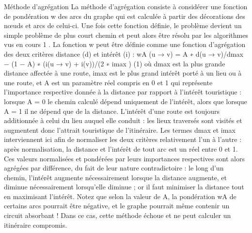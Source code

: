  
Méthode d’agrégation
La méthode d’agrégation consiste à considérer une fonction de pondération w des arcs du graphe
qui est calculée à partir des décorations des nœuds et arcs de celui-ci. Une fois cette fonction définie, le
problème devient un simple problème de plus court chemin et peut alors être résolu par les algorithmes
vus en cours 1 . La fonction w peut être définie comme une fonction d’agrégation des deux critères distance
(d) et intérêt (i) :
wA (u → v) = A ∗ d(u → v)/dmax − (1 − A) ∗ (i(u → v) + i(v))/(2 ∗ imax )
(1)
où dmax est la plus grande distance affectée à une route, imax est le plus grand intérêt porté à un lieu ou
à une route, et A est un paramètre réel compris en 0 et 1 qui représente l’importance respective donnée
à la distance par rapport à l’intérêt touristique : lorsque A = 0 le chemin calculé dépend uniquement
de l’intérêt, alors que lorsque A = 1 il ne dépend que de la distance. L’intérêt d’une route est toujours
additionnée à celui du lieu auquel elle conduit : les lieux traversés sont visités et augmentent donc l’attrait
touristique de l’itinéraire. Les termes dmax et imax interviennent ici afin de normaliser les deux critères
relativement l’un à l’autre : après normalisation, la distance et l’intérêt de tout arc est un réel entre 0 et 1.
Ces valeurs normalisées et pondérées par leurs importances respectives sont alors agrégées par différence,
du fait de leur nature contradictoire : le long d’un chemin, l’intérêt augmente nécessairement lorsque la
distance augmente, et diminue nécessairement lorsqu’elle diminue ; or il faut minimiser la distance tout
en maximisant l’intérêt. Notez que selon la valeur de A, la pondération wA de certains arcs pourrait être
négative, et le graphe pourrait même contenir un circuit absorbant ! Dans ce cas, cette méthode échoue
et ne peut calculer un itinéraire compromis.


\clearpage
